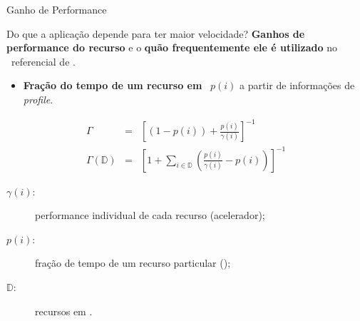    
      \begin{frame}{Ganho de Performance} \vspace{-1em}
         \begin{block}{Do que a aplicação depende para ter maior velocidade?}
            \textbf{Ganhos de performance do recurso} e o \textbf{quão frequentemente ele é utilizado} no \design\ referencial de \software.
         \end{block}
      
         \begin{itemize}
            \item \textbf{Fração do tempo de um recurso em \software}\ $ p(i) $ a partir de informações de \textit{profile}.
         \end{itemize}
            \vspace{-1em}
         \begin{eqnarray}
            \Gamma & = & \left [
                                 (1 - p(i))
                                 +
                                 \frac{
                                    p(i)
                                 }{
                                    \gamma(i)
                                 } \right 
                              ]^{-1} \\
\Gamma (\mathbb{D}) & = &
\left [
1 + \sum _{i \in \mathbb{D}} \left (
\frac{
   p(i)
}{
   \gamma(i)
}-p(i)
\right)
\right ]^{-1}
         \end{eqnarray}
         
         \begin{description}
            \item [$\gamma(i)$:] performance individual de cada recurso (acelerador);
            \item [$p(i)$:] fração de tempo de um recurso particular (\software);
            \item [$\mathbb{D}$:] recursos em \hardware.
         \end{description}
         
      
      \end{frame}
   
